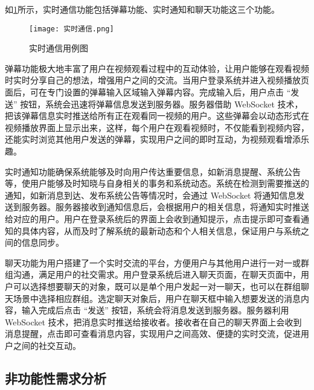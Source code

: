 如\ref{实时通信用例图}所示，实时通信功能包括弹幕功能、实时通知和聊天功能这三个功能。
\begin{figure}[hbt]
    \centering
    \texttt{[image: 实时通信.png]}
    \caption{实时通信用例图}
    \label{实时通信用例图}
\end{figure}

弹幕功能极大地丰富了用户在视频观看过程中的互动体验，让用户能够在观看视频时实时分享自己的想法，增强用户之间的交流。当用户登录系统并进入视频播放页面后，可在专门设置的弹幕输入区域输入弹幕内容。完成输入后，用户点击 “发送” 按钮，系统会迅速将弹幕信息发送到服务器。服务器借助 WebSocket 技术，把该弹幕信息实时推送给所有正在观看同一视频的用户。这些弹幕会以动态形式在视频播放界面上显示出来，这样，每个用户在观看视频时，不仅能看到视频内容，还能实时浏览其他用户发送的弹幕，实现用户之间的即时互动，为视频观看增添乐趣。

实时通知功能确保系统能够及时向用户传达重要信息，如新消息提醒、系统公告等，使用户能够及时知晓与自身相关的事务和系统动态。系统在检测到需要推送的通知，如新消息到达、发布系统公告等情况时，会通过 WebSocket 将通知信息发送到服务器。服务器接收到通知信息后，会根据用户的相关信息，将通知实时推送给对应的用户。用户在登录系统后的界面上会收到通知提示，点击提示即可查看通知的具体内容，从而及时了解系统的最新动态和个人相关信息，保证用户与系统之间的信息同步。

聊天功能为用户搭建了一个实时交流的平台，方便用户与其他用户进行一对一或群组沟通，满足用户的社交需求。用户登录系统后进入聊天页面，在聊天页面中，用户可以选择想要聊天的对象，既可以是单个用户发起一对一聊天，也可以在群组聊天场景中选择相应群组。选定聊天对象后，用户在聊天框中输入想要发送的消息内容，输入完成后点击 “发送” 按钮，系统会将消息发送到服务器。服务器利用 WebSocket 技术，把消息实时推送给接收者。接收者在自己的聊天界面上会收到消息提醒，点击即可查看消息内容，实现用户之间高效、便捷的实时交流，促进用户之间的社交互动。

\subsection{非功能性需求分析}


